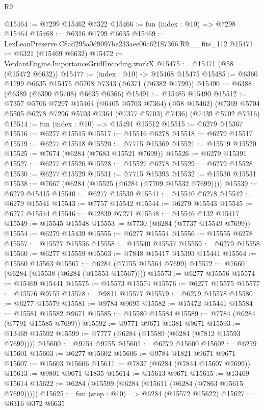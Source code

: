 \begin{lexlean}{R9}
\begin{coremodule}
@15464 := @7299 @15462 @7322
@15466 := fun (index : @10) => @7298 @15464
@15468 := @6316 @1799 @6635
@15469 := LexLeanPreserve.C8ad295a0d9097be233aee06c62187366.R9.__fits_112
@15471 := @6321 (@15469 @6632)
@15472 := VerdantEngine.ImportanceGridEncoding.workX
@15475 := @15471 (@58 (@15472 @6632))
@15477 := (index : @10) -> @15468 @15475
@15485 := @6360 @1799 @6635 @15475 @5708 @7343 (@6371 (@6382 @1799))
@15490 := @6388 (@6389 (@6390 @5708) @6635 @6366)
@15491 := @15485 @15490
@15512 := @7357
    @5706
    @7297
    @15464
    (@6405 @5703 @7364)
    (@58 @15462)
    (@7369 @5704 @5505 @6278 @7296 @5703 @7364 (@7377 @5703) @7436)
    (@7439 @5702 @7316)
@15514 := fun (index : @10) => @15491 @15512
@15515 := @6279 @15367
@15516 := @6277 @15515
@15517 := @15516 @6278
@15518 := @6279 @15517
@15519 := @6277 @15518
@15520 := @7715 @15369
@15521 := @15519 @15520
@15525 := @7674 (@6284 (@7683 @15521 @7699))
@15526 := @6279 @15391
@15527 := @6277 @15526
@15528 := @15527 @6278
@15529 := @6279 @15528
@15530 := @6277 @15529
@15531 := @7715 @15393
@15532 := @15530 @15531
@15538 := @7667 (@6284 (@15525 (@6284 (@7709 @15532 @7699))))
@15539 := @6279 @15415
@15540 := @6277 @15539
@15541 := @15540 @6278
@15542 := @6279 @15541
@15543 := @7757 @15542
@15544 := @6279 @15543
@15545 := @6277 @15544
@15546 := @12839 @7271
@15548 := @15546 @132 @15417
@15549 := @15545 @15548
@15553 := @7730 (@6284 (@7737 @15549 @7699))
@15554 := @6279 @15439
@15555 := @6277 @15554
@15556 := @15555 @6278
@15557 := @15527 @15556
@15558 := @15540 @15557
@15559 := @6279 @15558
@15560 := @6277 @15559
@15563 := @7848 @15417 @15393 @15441
@15564 := @15560 @15563
@15567 := @6284 (@7755 @15564 @7699)
@15572 := @7660 (@6284 (@15538 (@6284 (@15553 @15567))))
@15573 := @6277 @15556
@15574 := @15469 @15441
@15575 := @15573 @15574
@15576 := @6277 @15575
@15577 := @15576 @9755
@15578 := @9811 @15577
@15579 := @6279 @15578
@15580 := @6277 @15579
@15581 := @9784 @9695
@15582 := @15472 @15441
@15584 := @15581 @15582 @9671
@15585 := @15580 @15584
@15589 := @7784 (@6284 (@7791 @15585 @7699))
@15592 := @9771 @9671 @1381 @9671
@15593 := @13469 @15592
@15599 := @7777 (@6284 (@15589 (@6284 (@7812 @15593 @7699))))
@15600 := @9754 @9755
@15601 := @6279 @15600
@15602 := @6279 @15601
@15603 := @6277 @15602
@15606 := @9784 @1821 @9671 @9671
@15607 := @15603 @15606
@15611 := @7837 (@6284 (@7844 @15607 @7699))
@15613 := @9801 @9671 @1835
@15614 := @15613 @9671
@15615 := @13469 @15614
@15622 := @6284 (@15599 (@6284 (@15611 (@6284 (@7863 @15615 @7699)))))
@15625 := fun (step : @10) => @6284 (@15572 @15622)
@15627 := @6316 @372 @6635

\end{coremodule}
\end{lexlean}
